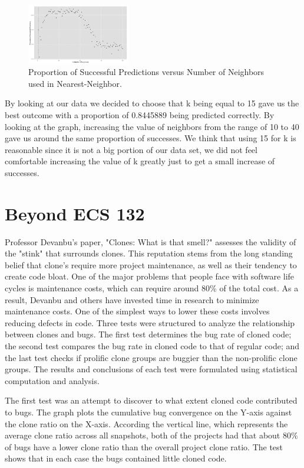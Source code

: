 \documentclass{article}
\begin{document}
\begin{figure}
  \centering
  \includegraphics[width=0.4\textwidth]{knn_prop_pred.jpg}
  \caption{Proportion of Successful Predictions versus Number of Neighbors used in Nearest-Neighbor.}
\end{figure}

By looking at our data we decided to choose that k being equal to 15 gave us
the best outcome with a proportion of 0.8445889 being predicted correctly. By
looking at the graph, increasing the value of neighbors from the range of 10 to
40 gave us around the same proportion of successes. We think that using 15 for
k is reasonable since it is not a big portion of our data set, we did not feel
comfortable increasing the value of k greatly just to get a small increase of
successes.


\section{Beyond ECS 132}

Professor Devanbu's paper, "Clones: What is that smell?" assesses the validity of the "stink"
that surrounds clones.  This reputation stems from the long standing belief that clone's require
more project maintenance, as well as their tendency to create code bloat. One of the major
problems that people face with software life cycles is maintenance costs, which can require
around 80\% of the total cost. As a result, Devanbu and others have invested time in research
to minimize maintenance costs. One of the simplest ways to lower these costs involves
reducing defects in code. Three tests were structured to analyze the relationship between
clones and bugs. The first test determines the bug rate of cloned code; the second test
compares the bug rate in cloned code to that of regular code; and the last test checks
if prolific clone groups are buggier than the non-prolific clone groups. The results and
conclusions of each test were formulated using statistical computation and analysis.

The first test was an attempt to discover to what extent cloned code contributed to bugs.
The graph plots the cumulative bug convergence on the Y-axis against the clone ratio on the
X-axis. According the vertical line, which represents the average clone ratio across all
snapshots, both of the projects had that about 80\% of bugs have a lower clone ratio than
the overall project clone ratio. The test shows that in each case the bugs contained little
cloned code.
\end{document}
